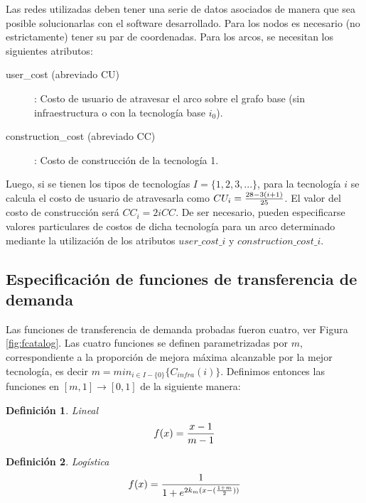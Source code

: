 \documentclass{article}
\newtheorem{definition}{Definición}
\begin{document}
  Las redes utilizadas deben tener una serie de datos asociados de manera que sea posible solucionarlas con el software desarrollado. Para los nodos es necesario (no estrictamente) tener su par de coordenadas. Para los arcos, se necesitan los siguientes atributos:

  \begin{description}
    \item[user\_cost (abreviado CU)]: Costo de usuario de atravesar el arco sobre el grafo base (sin infraestructura o con la tecnología base $i_0$).
    \item[construction\_cost (abreviado CC)]: Costo de construcción de la tecnología 1.
  \end{description}

  Luego, si se tienen los tipos de tecnologías $I = \{1, 2, 3, ... \}$, para la tecnología $i$ se calcula el costo de usuario de atravesarla como $CU_i = {28 - 3 (i + 1) \over 25}$. El valor del costo de construcción será $CC_i = 2i CC$. De ser necesario, pueden especificarse valores particulares de costos de dicha tecnología para un arco determinado mediante la utilización de los atributos $user\_cost\_i$ y $construction\_cost\_i$.

  \subsection{Especificación de funciones de transferencia de demanda}

  Las funciones de transferencia de demanda probadas fueron cuatro, ver Figura \ref{fig:fcatalog}. Las cuatro funciones se definen parametrizadas por $m$, correspondiente a la proporción de mejora máxima alcanzable por la mejor tecnología, es decir $m = min_{i \in I - \{0\}} \{ C_{infra}(i) \}$. Definimos entonces las funciones en $[m, 1] \rightarrow [0, 1]$ de la siguiente manera:

  \begin{definition}
    Lineal
    \begin{align}
        f(x) = {x -1 \over m - 1}
    \end{align}
  \end{definition}

  \begin{definition}
    Logística
    \begin{align}
        f(x) = {1 \over 1 + e^{2k_m(x - ({1 + m \over 2}))}}
    \end{align}
  \end{definition}
\end{document}
